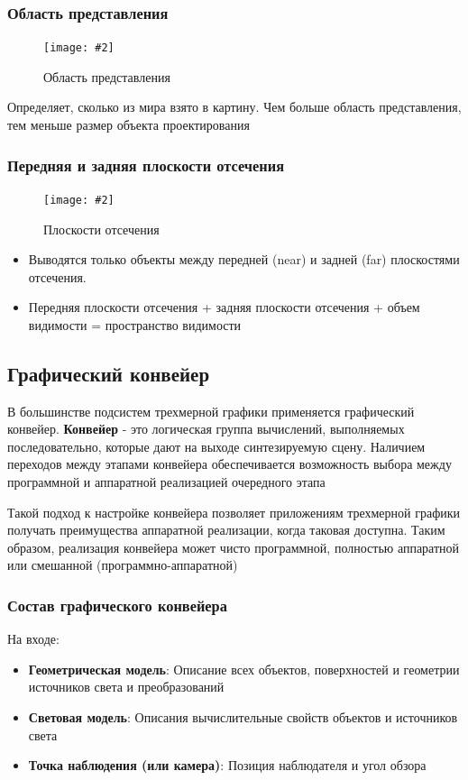 \documentclass[a4paper, 14pt]{extarticle}
\newcommand{\screenshot}[3]{
	\begin{figure}[h]
		\centering
		\texttt{[image: \#2]}
		\caption{#3}
	\end{figure}
}
\begin{document}
\subsubsection{Область представления}
\screenshot{width=9cm}{l5/S026.jpg}{Область представления}
Определяет, сколько из мира взято в картину. Чем больше область представления, тем меньше размер объекта проектирования

\subsubsection{Передняя и задняя плоскости отсечения}
\screenshot{width=9cm}{l5/S027.jpg}{Плоскости отсечения}
\begin{itemize}
	\item Выводятся только объекты между передней (near) и задней (far) плоскостями отсечения. 
	\item Передняя плоскости отсечения + задняя плоскости отсечения +	объем видимости = пространство видимости
	
\end{itemize}

\FloatBarrier
\subsection{Графический конвейер}
В большинстве подсистем трехмерной графики применяется графический конвейер. \textbf{Конвейер} - это логическая группа вычислений, выполняемых последовательно, которые дают на выходе синтезируемую сцену. Наличием переходов между этапами конвейера обеспечивается возможность выбора между программной и аппаратной реализацией очередного этапа

Такой подход к настройке конвейера позволяет приложениям трехмерной графики получать преимущества аппаратной реализации, когда таковая доступна. Таким образом, реализация конвейера может чисто программной, полностью аппаратной или смешанной (программно-аппаратной)

\subsubsection{Состав графического конвейера}
На входе:
\begin{itemize}
	\item \textbf{Геометрическая модель}: Описание всех объектов, поверхностей и геометрии источников света и преобразований
	\item \textbf{Световая модель}: Описания вычислительные свойств объектов и источников света
	\item \textbf{Точка наблюдения (или камера)}: Позиция наблюдателя и угол обзора
\end{itemize}
\end{document}
